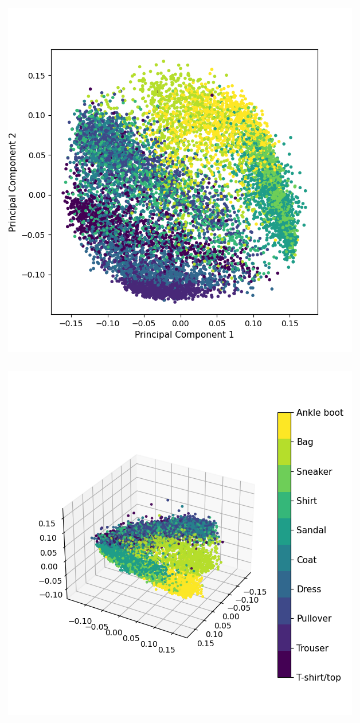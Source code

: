 \documentclass[12pt]{article}
\begin{document}
\begin{figure}[h]
\begin{subfigure}{0.5\textwidth}
		\caption{}
		\label{subfig:pca_poly_3comps}
	\end{subfigure}
	\begin{subfigure}{0.5\textwidth}
		\includegraphics[width=0.4\textheight]{pca_sigmoid_2comps.png}
		\caption{}
		\label{subfig:pca_sigmoid_2comps}
	\end{subfigure}
	\begin{subfigure}{0.5\textwidth}
		\includegraphics[width=0.4\textheight]{pca_sigmoid_3comps.png}

\end{subfigure}
\end{figure}
\end{document}

